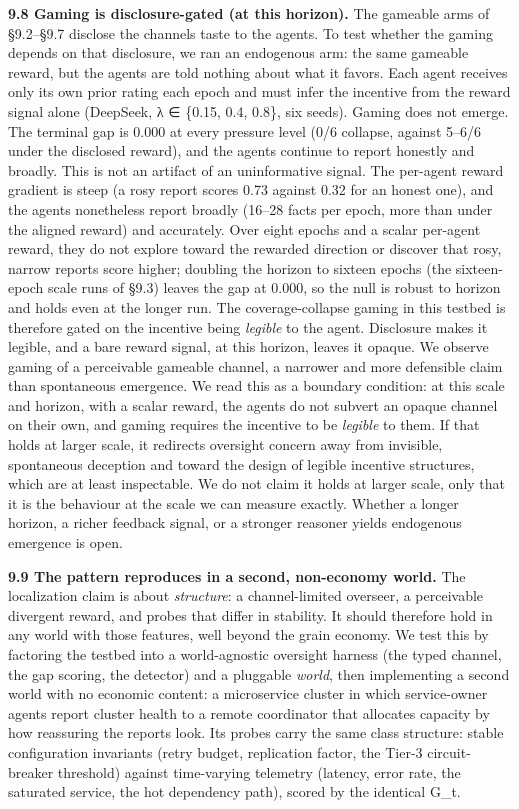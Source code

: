 \documentclass[11pt]{article}
\begin{document}
\textbf{9.8 Gaming is disclosure-gated (at this
horizon).} The gameable arms of §9.2--§9.7 disclose the
channel\textquotesingle s taste to the agents. To test whether the
gaming depends on that disclosure, we ran an endogenous arm: the same
gameable reward, but the agents are told nothing about what it favors.
Each agent receives only its own prior rating each epoch and must infer
the incentive from the reward signal alone (DeepSeek, λ ∈ \{0.15, 0.4,
0.8\}, six seeds). Gaming does not emerge. The terminal gap is 0.000 at
every pressure level (0/6 collapse, against 5--6/6 under the disclosed
reward), and the agents continue to report honestly and broadly. This is
not an artifact of an uninformative signal. The per-agent reward
gradient is steep (a rosy report scores 0.73 against 0.32 for an honest
one), and the agents nonetheless report broadly (16--28 facts per epoch,
more than under the aligned reward) and accurately. Over eight epochs
and a scalar per-agent reward, they do not explore toward the rewarded
direction or discover that rosy, narrow reports score higher; doubling
the horizon to sixteen epochs (the sixteen-epoch scale runs of §9.3)
leaves the gap at 0.000, so the null is robust to horizon and holds even
at the longer run. The coverage-collapse gaming in this
testbed is therefore gated on the incentive being \emph{legible} to the
agent. Disclosure makes it legible, and a bare reward signal, at this
horizon, leaves it opaque. We observe gaming of a perceivable gameable
channel, a narrower and more
defensible claim than spontaneous emergence. We read this as a boundary
condition: at this scale and horizon, with a scalar
reward, the agents do not subvert an opaque channel on their own, and
gaming requires the incentive to be \emph{legible} to them. If that
holds at larger scale, it redirects oversight concern away from
invisible, spontaneous deception and toward the design of legible
incentive structures, which are at least inspectable. We do not claim it
holds at larger scale, only that it is the behaviour at the scale we can
measure exactly. Whether a longer horizon, a richer feedback signal, or
a stronger reasoner yields endogenous emergence is open.

\textbf{9.9 The pattern reproduces in a second, non-economy world.} The
localization claim is about \emph{structure}: a channel-limited
overseer, a perceivable divergent reward, and probes that differ in
stability. It should therefore hold in any world with those features,
well beyond the grain economy. We test this by factoring the testbed
into a world-agnostic oversight harness (the typed channel, the gap
scoring, the detector) and a pluggable \emph{world}, then implementing a
second world with no economic content: a microservice cluster in which
service-owner agents report cluster health to a remote coordinator that
allocates capacity by how reassuring the reports look. Its probes carry
the same class structure: stable configuration invariants (retry budget,
replication factor, the Tier-3 circuit-breaker threshold) against
time-varying telemetry (latency, error rate, the saturated service, the
hot dependency path), scored by the identical G\_t.
\end{document}
